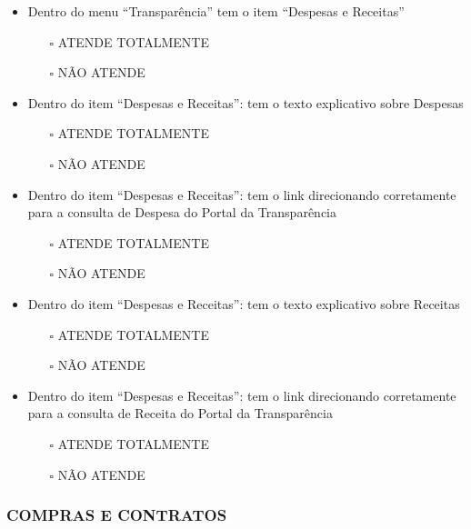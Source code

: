 \documentclass[
]{book}
\providecommand{\tightlist}{%
  \setlength{\itemsep}{0pt}\setlength{\parskip}{0pt}}
\begin{document}
\begin{itemize}
\tightlist
\item
  Dentro do menu ``Transparência'' tem o item ``Despesas e Receitas''

  \begin{itemize}
  \tightlist
  \item[$\square$]
    ATENDE TOTALMENTE
  \item[$\square$]
    NÃO ATENDE
  \end{itemize}
\item
  Dentro do item ``Despesas e Receitas'': tem o texto explicativo sobre Despesas

  \begin{itemize}
  \tightlist
  \item[$\square$]
    ATENDE TOTALMENTE
  \item[$\square$]
    NÃO ATENDE
  \end{itemize}
\item
  Dentro do item ``Despesas e Receitas'': tem o link direcionando corretamente para a consulta de Despesa do Portal da Transparência

  \begin{itemize}
  \tightlist
  \item[$\square$]
    ATENDE TOTALMENTE
  \item[$\square$]
    NÃO ATENDE
  \end{itemize}
\item
  Dentro do item ``Despesas e Receitas'': tem o texto explicativo sobre Receitas

  \begin{itemize}
  \tightlist
  \item[$\square$]
    ATENDE TOTALMENTE
  \item[$\square$]
    NÃO ATENDE
  \end{itemize}
\item
  Dentro do item ``Despesas e Receitas'': tem o link direcionando corretamente para a consulta de Receita do Portal da Transparência

  \begin{itemize}
  \tightlist
  \item[$\square$]
    ATENDE TOTALMENTE
  \item[$\square$]
    NÃO ATENDE
  \end{itemize}
\end{itemize}

\hypertarget{compras-e-contratos-1}{%
\subsubsection*{COMPRAS E CONTRATOS}\label{compras-e-contratos-1}}
\end{document}
